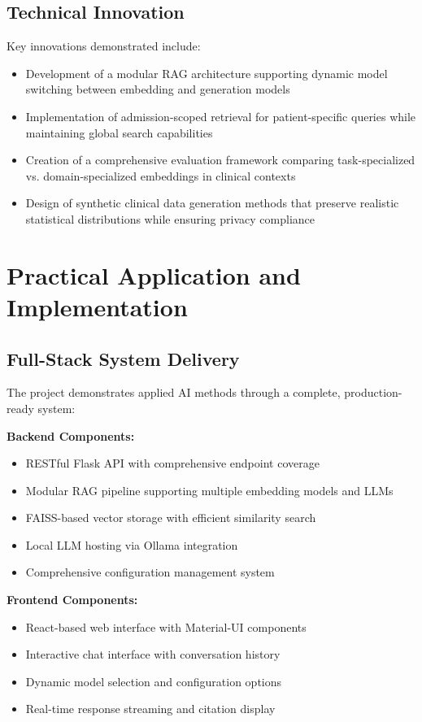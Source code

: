 \subsection{Technical Innovation}
Key innovations demonstrated include:
\begin{itemize}
    \item Development of a modular RAG architecture supporting dynamic model switching between embedding and generation models
    \item Implementation of admission-scoped retrieval for patient-specific queries while maintaining global search capabilities
    \item Creation of a comprehensive evaluation framework comparing task-specialized vs. domain-specialized embeddings in clinical contexts
    \item Design of synthetic clinical data generation methods that preserve realistic statistical distributions while ensuring privacy compliance
\end{itemize}

\section{Practical Application and Implementation}

\subsection{Full-Stack System Delivery}
The project demonstrates applied AI methods through a complete, production-ready system:

\textbf{Backend Components:}
\begin{itemize}
    \item RESTful Flask API with comprehensive endpoint coverage
    \item Modular RAG pipeline supporting multiple embedding models and LLMs
    \item FAISS-based vector storage with efficient similarity search
    \item Local LLM hosting via Ollama integration
    \item Comprehensive configuration management system
\end{itemize}

\textbf{Frontend Components:}
\begin{itemize}
    \item React-based web interface with Material-UI components
    \item Interactive chat interface with conversation history
    \item Dynamic model selection and configuration options
    \item Real-time response streaming and citation display
\end{itemize}

